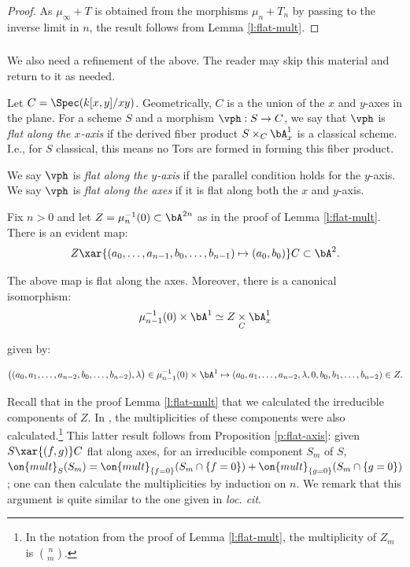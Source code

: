 \begin{proof}

As $\mu_{\infty}+T$ is obtained from the morphisms
$\mu_n+T_n$ by passing to the inverse limit in $n$, the
result follows from Lemma \ref{l:flat-mult}.

\end{proof}

\subsubsection{}\label{ss:refinement}

We also need a refinement of the above. The reader may skip this
material and return to it as needed.

Let $C = \Spec(k[x,y]/xy)$. Geometrically, $C$ is a the union of the
$x$ and $y$-axes in the plane. For a scheme $S$ and a morphism
$\vph:S \to C$, we say that $\vph$ is \emph{flat along the $x$-axis}
if the derived fiber product $S \times_C \bA_x^1$ is a classical
scheme. I.e., for $S$ classical, this means no Tors are formed in
forming this fiber product.

We say $\vph$ is \emph{flat along the $y$-axis} if
the parallel condition holds for the $y$-axis.
We say $\vph$ is \emph{flat along the axes} if it
is flat along both the $x$ and $y$-axis.

Fix $n>0$ and let $Z = \mu_n^{-1}(0) \subset \bA^{2n}$ as in
the proof of Lemma \ref{l:flat-mult}.
There
is an evident map:
%
\[
Z \xar{(a_0,\ldots,a_{n-1},b_0,\ldots,b_{n-1}) \mapsto (a_0,b_0)} C
\subset \bA^2.
\]

\begin{prop}
\notready\label{p:flat-axis}

The above map is flat along the axes.
Moreover, there is a canonical isomorphism:
%
\[
\mu_{n-1}^{-1}(0) \times \bA^1 \simeq Z \underset{C}{\times} \bA_x^1
\]

 given by:

%
\[
\big((a_0,a_1,\ldots,a_{n-2},b_0,\ldots,b_{n-2}),\lambda\big) \in
\mu_{n-1}^{-1}(0) \times \bA^1 \mapsto
(a_0,a_1,\ldots,a_{n-2},\lambda,0,b_0,b_1,\ldots,b_{n-2}) \in Z.
\]

\end{prop}

\begin{rem}
\notready

Recall that in the proof Lemma \ref{l:flat-mult} that we calculated
the irreducible components of $Z$. In \cite{yuen}, the multiplicities
of these components were also calculated.\footnote{In the notation from
the proof of Lemma \ref{l:flat-mult}, the multiplicity of
$Z_m$ is $\binom{n}{m}$.}
This latter result follows from Proposition \ref{p:flat-axis}:
given $S \xar{(f,g)} C$ flat along axes, for an irreducible
component $S_m$ of $S$, $\on{mult}_S(S_m) =
\on{mult}_{\{f = 0\}}(S_m \cap \{f = 0\}) + \on{mult}_{\{g = 0\}}(S_m \cap \{g = 0\})$;
one can then calculate the multiplicities by induction on $n$.
We remark that this argument is quite similar to the one given in \emph{loc. cit}.

\end{rem}

